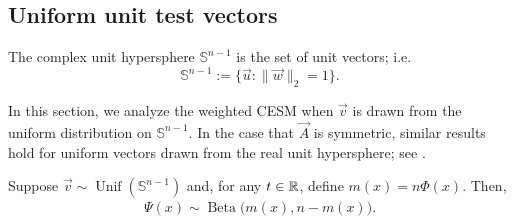 \subsection{Uniform unit test vectors}

\begin{definition}
    \label{eqn:hypersphere}
    The complex unit hypersphere \( \mathbb{S}^{n-1} \) is the set of unit vectors; i.e. 
    \begin{equation*}
        \mathbb{S}^{n-1} := \{ \vec{u} : \| \vec{w} \|_2 = 1\}.
    \end{equation*}
\end{definition}

In this section, we analyze the weighted CESM when \( \vec{v} \) is drawn from the uniform distribution on \( \mathbb{S}^{n-1} \).
In the case that \( \vec{A} \) is symmetric, similar results hold for uniform vectors drawn from the real unit hypersphere; see \cite{chen_trogdon_ubaru_22}.

\begin{lemma}
\label{thm:psi_beta}
Suppose \( \vec{v} \sim \operatorname{Unif}(\mathbb{S}^{n-1}) \) and, for any \( t\in \mathbb{R} \), define \( m(x) = n \Phi(x) \).
Then, 
\begin{align*}
    \Psi(x) \sim \operatorname{Beta} \big( m(x), n - m(x) \big).
\end{align*}
\end{lemma}

